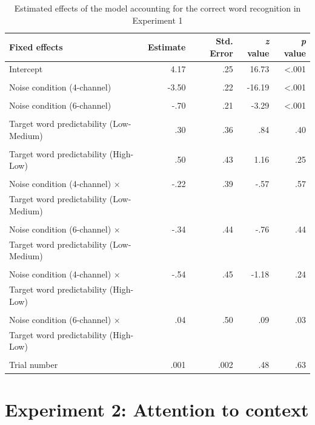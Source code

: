 \documentclass[a4paper, nobind]{templates/ociamthesis}
\begin{document}
\begin{table}[ht]
\begin{center}
\caption{Estimated effects of the model accounting for the correct word recognition in Experiment 1}
\label{results1a} 
\vskip 0.12in
\begin{tabular}[]{@{}lrrrr@{}}
\toprule
Fixed effects & Estimate & Std. Error & \emph{z} value & \emph{p}
value \\
\midrule
Intercept & 4.17 & .25 & 16.73 & \textless.001 \\
\\
Noise condition (4-channel) & -3.50 & .22 & -16.19 & \textless.001 \\
\\
Noise condition (6-channel) & -.70 & .21 & -3.29 & \textless.001 \\
\\
Target word predictability (Low-Medium) & .30 & .36 & .84 & .40 \\
\\
Target word predictability (High-Low) & .50 & .43 & 1.16 & .25 \\
\\
Noise condition (4-channel) $\times$ & -.22 & .39 & -.57 & .57 \\
Target word predictability (Low-Medium) \\
\\
Noise condition (6-channel) $\times$ & -.34 & .44 & -.76 & .44 \\
Target word predictability (Low-Medium) \\
\\
Noise condition (4-channel) $\times$ & -.54 & .45 & -1.18 & .24 \\
Target word predictability (High-Low) \\
\\
Noise condition (6-channel) $\times$ & .04 & .50 & .09 & .03 \\
Target word predictability (High-Low) \\
\\
Trial number & .001 & .002 & .48 & .63 \\
\bottomrule
\end{tabular} 
\end{center} 
\end{table}

\hypertarget{experiment1b}{%
\section{Experiment 2: Attention to context}\label{experiment1b}}
\end{document}
